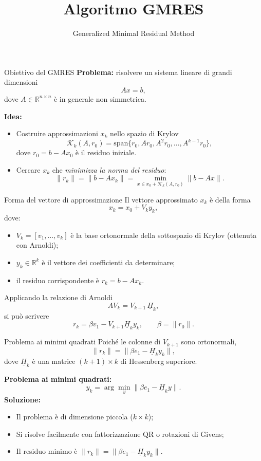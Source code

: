 \documentclass[aspectratio=169]{beamer}
\title{Algoritmo GMRES}
\subtitle{Generalized Minimal Residual Method}
\author{}
\date{}
\begin{document}
\begin{frame}
  \titlepage
\end{frame}

\begin{frame}{Obiettivo del GMRES}
\textbf{Problema:} risolvere un sistema lineare di grandi dimensioni
\[
A x = b,
\]
dove $A \in \mathbb{R}^{n\times n}$ è in generale non simmetrica.

\medskip
\textbf{Idea:}
\begin{itemize}
  \item Costruire approssimazioni $x_k$ nello spazio di Krylov
  \[
  \mathcal{K}_k(A,r_0)=\mathrm{span}\{r_0, A r_0, A^2 r_0, \dots, A^{k-1} r_0\},
  \]
  dove $r_0=b-Ax_0$ è il residuo iniziale.
  \item Cercare $x_k$ che \emph{minimizza la norma del residuo}:
  \[
  \|r_k\| = \|b - A x_k\| = \min_{x \in x_0+\mathcal{K}_k(A,r_0)} \|b - A x\|.
  \]
\end{itemize}
\end{frame}

\begin{frame}{Forma del vettore di approssimazione}
Il vettore approssimato $x_k$ è della forma
\[
x_k = x_0 + V_k y_k,
\]
dove:
\begin{itemize}
  \item $V_k = [v_1, \dots, v_k]$ è la base ortonormale della sottospazio di Krylov (ottenuta con Arnoldi);
  \item $y_k \in \mathbb{R}^k$ è il vettore dei coefficienti da determinare;
  \item il residuo corrispondente è $r_k = b - A x_k$.
\end{itemize}

\medskip
Applicando la relazione di Arnoldi
\[
A V_k = V_{k+1}\,\underline{H}_k,
\]
si può scrivere
\[
r_k = \beta v_1 - V_{k+1}\underline{H}_k y_k,
\qquad \beta = \|r_0\|.
\]
\end{frame}

\begin{frame}{Problema ai minimi quadrati}
Poiché le colonne di $V_{k+1}$ sono ortonormali,
\[
\|r_k\| = \|\beta e_1 - \underline{H}_k y_k\|,
\]
dove $\underline{H}_k$ è una matrice $(k+1)\times k$ di Hessenberg superiore.

\medskip
\textbf{Problema ai minimi quadrati:}
\[
y_k = \arg\min_y \|\beta e_1 - \underline{H}_k y\|.
\]
\textbf{Soluzione:}
\begin{itemize}
  \item Il problema è di dimensione piccola ($k\times k$);
  \item Si risolve facilmente con fattorizzazione QR o rotazioni di Givens;
  \item Il residuo minimo è $\|r_k\| = \|\beta e_1 - \underline{H}_k y_k\|$.
\end{itemize}
\end{frame}
\end{document}
